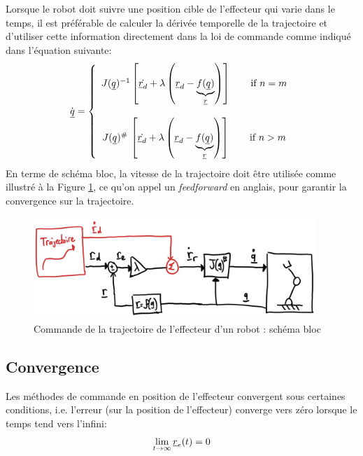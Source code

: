 Lorsque le robot doit suivre une position cible de l'effecteur qui varie dans le temps, il est préférable de calculer la dérivée temporelle de la trajectoire et d'utiliser cette information directement dans la loi de commande comme indiqué dans l'équation suivante:
\begin{align}
\dot{\underline{q}} = \left\{ \begin{array}{c}
 J(\underline{q})^{-1} \left[ \dot{\underline{r}_d} + \lambda \left( \underline{r}_d  - \underbrace{f(\underline{q})}_{\underline{r}} \right) \right] \quad\quad \text{if $n=m$}
 \\ \\
 J(\underline{q})^{\#} \, \left[ \dot{\underline{r}_d} + \lambda \left( \underline{r}_d  - \underbrace{f(\underline{q})}_{\underline{r}} \right) \right]   \quad\quad \text{if $n>m$}
\end{array}
\right.
\end{align}
En terme de schéma bloc, la vitesse de la trajectoire doit être utilisée comme illustré à la Figure \ref{fig:robotspeedcontroltraj}, ce qu'on appel un \textit{feedforward} en anglais, pour garantir la convergence sur la trajectoire.
\begin{figure}[H]
	\centering
		\includegraphics[width=0.95\textwidth]{fig/robotspeedcontroltraj.jpg}
	\caption{Commande de la trajectoire de l'effecteur d'un robot : schéma bloc}
	\label{fig:robotspeedcontroltraj}
\end{figure}


\subsection{Convergence}

Les méthodes de commande en position de l'effecteur convergent sous certaines conditions, i.e. l'erreur (sur la position de l'effecteur) converge vers zéro lorsque le temps tend vers l'infini:
\begin{align}
\lim_{t \rightarrow \infty } \underline{r}_e(t) = 0 
\end{align}

